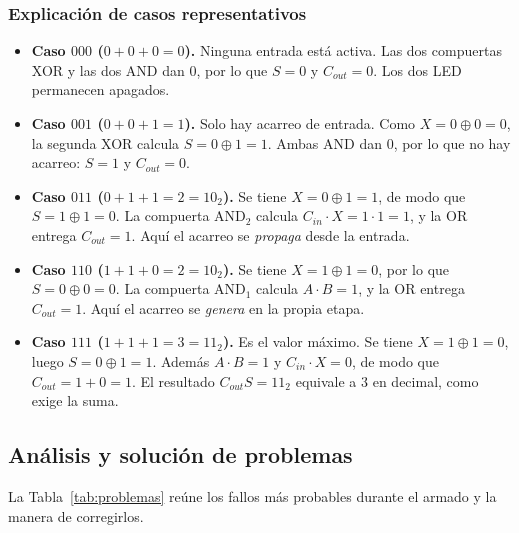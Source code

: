 \documentclass[10pt]{article}
\begin{document}
\subsubsection{Explicación de casos representativos}

\begin{itemize}
  \item \textbf{Caso $000$ ($0+0+0=0$).} Ninguna entrada está activa. Las dos
        compuertas XOR y las dos AND dan 0, por lo que $S=0$ y $C_{out}=0$. Los
        dos LED permanecen apagados.

  \item \textbf{Caso $001$ ($0+0+1=1$).} Solo hay acarreo de entrada. Como
        $X = 0\oplus 0 = 0$, la segunda XOR calcula $S = 0\oplus 1 = 1$. Ambas
        AND dan 0, por lo que no hay acarreo: $S=1$ y $C_{out}=0$.

  \item \textbf{Caso $011$ ($0+1+1=2=10_2$).} Se tiene $X = 0\oplus 1 = 1$, de
        modo que $S = 1\oplus 1 = 0$. La compuerta AND$_2$ calcula
        $C_{in}\cdot X = 1\cdot 1 = 1$, y la OR entrega $C_{out}=1$. Aquí el
        acarreo se \textit{propaga} desde la entrada.

  \item \textbf{Caso $110$ ($1+1+0=2=10_2$).} Se tiene $X = 1\oplus 1 = 0$, por
        lo que $S = 0\oplus 0 = 0$. La compuerta AND$_1$ calcula
        $A\cdot B = 1$, y la OR entrega $C_{out}=1$. Aquí el acarreo se
        \textit{genera} en la propia etapa.

  \item \textbf{Caso $111$ ($1+1+1=3=11_2$).} Es el valor máximo. Se tiene
        $X = 1\oplus 1 = 0$, luego $S = 0\oplus 1 = 1$. Además $A\cdot B = 1$ y
        $C_{in}\cdot X = 0$, de modo que $C_{out} = 1 + 0 = 1$. El resultado
        $C_{out}S = 11_2$ equivale a $3$ en decimal, como exige la suma.
\end{itemize}

\subsection{Análisis y solución de problemas}

La Tabla~\ref{tab:problemas} reúne los fallos más probables durante el armado y
la manera de corregirlos.
\end{document}
